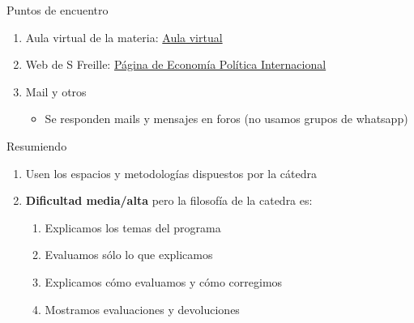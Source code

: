 \documentclass[
  ignorenonframetext,
]{beamer}
\providecommand{\tightlist}{%
  \setlength{\itemsep}{0pt}\setlength{\parskip}{0pt}}\usepackage{longtable,booktabs,array}
\begin{document}
\begin{frame}{Puntos de encuentro}
\protect\hypertarget{puntos-de-encuentro}{}
\begin{enumerate}
\tightlist
\item
  Aula virtual de la materia:
  \href{https://campusvirtual.ucc.edu.ar/course/view.php?id=2037}{Aula
  virtual}
\item
  Web de S Freille:
  \href{https://sfreille.github.io/teaching/epin}{Página de Economía
  Política Internacional}
\item
  Mail y otros

  \begin{itemize}
  \tightlist
  \item
    Se responden mails y mensajes en foros (no usamos grupos de
    whatsapp)
  \end{itemize}
\end{enumerate}
\end{frame}

\begin{frame}{Resumiendo}
\protect\hypertarget{resumiendo}{}
\begin{enumerate}
\tightlist
\item
  Usen los espacios y metodologías dispuestos por la cátedra
\item
  \textbf{Dificultad media/alta} pero la filosofía de la catedra es:

  \begin{enumerate}
  \tightlist
  \item
    Explicamos los temas del programa
  \item
    Evaluamos sólo lo que explicamos
  \item
    Explicamos cómo evaluamos y cómo corregimos
  \item
    Mostramos evaluaciones y devoluciones
  \end{enumerate}
\end{enumerate}
\end{frame}
\end{document}
